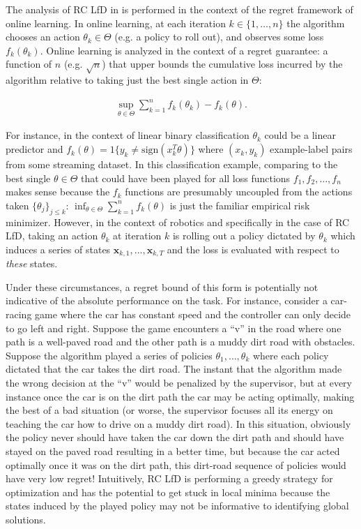 \documentclass[10pt, conference]{ieeeconf}      %
\newcommand{\bx}{\mathbf{x}}
\begin{document}
The analysis of RC LfD in \cite{ross2010reduction} is performed in the context of the regret framework of online learning. 
In online learning, at each iteration $k \in \{1,\dots,n\}$ the algorithm chooses an action $\theta_k \in \Theta$ (e.g. a policy to roll out), and observes some loss $f_k(\theta_k)$. 
Online learning is analyzed in the context of a regret guarantee: a function of $n$ (e.g. $\sqrt{n}$) that upper bounds the cumulative loss incurred by the algorithm relative to taking just the best single action in $\Theta$:

\begin{align*}
\sup_{\theta \in \Theta} \sum_{k=1}^n f_k(\theta_k) - f_k(\theta).
\end{align*}

For instance, in the context of linear binary classification $\theta_k$ could be a linear predictor and $f_k(\theta)= 1\{ y_k \neq \text{sign}(x_k^T\theta) \}$ where $(x_k,y_k)$ example-label pairs from some streaming dataset. 
In this classification example, comparing to the best single $\theta \in \Theta$ that could have been played for all loss functions $f_1,f_2,\dots,f_n$ makes sense because the $f_k$ functions are presumably uncoupled from the actions taken $\{\theta_j\}_{j \leq k}$: $\inf_{\theta \in \Theta} \sum_{k=1}^n f_k(\theta)$ is just the familiar empirical risk minimizer. 
However, in the context of robotics and specifically in the case of RC LfD, taking an action $\theta_k$ at iteration $k$ is rolling out a policy dictated by $\theta_k$ which induces a series of states $\bx_{k,1},\dots,\bx_{k,T}$ and the loss is evaluated with respect to {\em these} states.  

Under these circumstances, a regret bound of this form is potentially not indicative of the absolute performance on the task.
For instance, consider a car-racing game where the car has constant speed and the controller can only decide to go left and right. Suppose the game encounters a ``v'' in the road where one path is a well-paved road and the other path is a muddy dirt road with obstacles. Suppose the algorithm played a series of policies $\theta_1,\dots,\theta_k$ where each policy dictated that the car takes the dirt road. The instant that the algorithm made the wrong decision at the ``v'' would be penalized by the supervisor, but at every instance once the car is on the dirt path the car may be acting optimally, making the best of a bad situation (or worse, the supervisor focuses all its energy on teaching the car how to drive on a muddy dirt road). In this situation, obviously the policy never should have taken the car down the dirt path and should have stayed on the paved road resulting in a better time, but because the car acted optimally once it was on the dirt path, this dirt-road sequence of policies would have very low regret!
Intuitively, RC LfD is performing a greedy strategy for optimization and has the potential to get stuck in local minima because the states induced by the played policy may not be informative to identifying global solutions.
\end{document}
